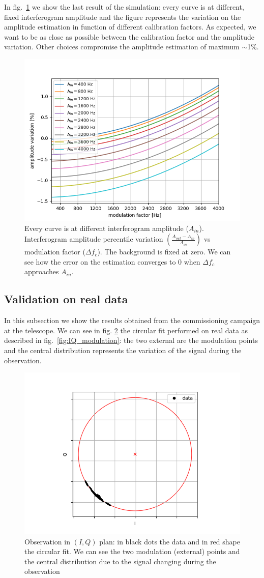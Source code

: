 \documentclass[twocolumn,traditabstract]{aa}\\
\begin{document}
\noindent In fig.~\ref{fig:amp_mod} we show the last result of the simulation: every curve is at different, fixed interferogram amplitude and the figure represents the variation on the amplitude estimation in function of different calibration factors. As expected, we want to be as close as possible between the calibration factor and the amplitude variation. Other choices compromise the amplitude estimation of maximum $\sim$1\%.

\begin{figure}[htf]
	\centering
 	\includegraphics[width=.5\textwidth]{3.acqui/several_modulations.png}
	\caption{Every curve is at different interferogram amplitude ($A_{in}$). Interferogram amplitude percentile variation $\left( \frac{A_{out}-A_{in}}{A_{in}} \right)$ vs modulation factor ($\Delta f_c$).  The background is fixed at zero. We can see how the error on the estimation converges to 0 when $\Delta f_c$ approaches $A_{in}$. }
	\label{fig:amp_mod}
\end{figure}


\subsection{Validation on real data}
In this subsection we show the results obtained from the commissioning campaign at the telescope. We can see in fig. \ref{fig:circle} the circular fit performed on real data as described in fig.~\ref{fig:IQ_modulation}: the two external are the modulation points and the central distribution represents the variation of the signal during the observation.


\begin{figure}[htf]
	\centering
	\includegraphics[width=.5\textwidth]{4.results/circular_fit.png}
	\caption{Observation in $(I,Q)$ plan: in black dots the data and in red shape the circular fit. We can see the two modulation (external) points and the central distribution due to the signal changing during the observation}
	\label{fig:circle}
\end{figure}
\end{document}

